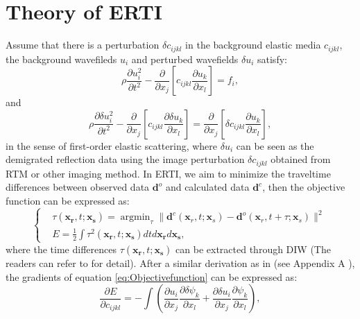 \section{Theory of ERTI}
Assume that there is a perturbation $\delta c_{ijkl}$ in the background elastic media
$c_{ijkl}$, the background wavefileds $u_i$ and perturbed wavefields
$\delta u_i$ satisfy:
\begin{equation}
    \rho \frac{\partial u^2_i}{\partial t^2}  -
    \frac{\partial}{\partial x_j}\left[ 
        c_{ijkl}\frac{\partial u_{k}}{\partial
        x_l}\right]=f_i,
    \label{eq:WE} 
\end{equation}
and
\begin{equation}
    \rho \frac{\partial \delta u^2_i}{\partial t^2}  -
    \frac{\partial}{\partial x_j}\left[ 
        c_{ijkl}\frac{\partial \delta u_{k}}{\partial
        x_l}\right]=\frac{\partial}{\partial x_j}\left[\delta c_{ijkl}\frac{\partial u_{k}}{\partial x_l}\right],
    \label{eq:DeltaWE} 
\end{equation}
in the sense of first-order elastic scattering, where $\delta u_i$ can be seen as the demigrated reflection data using the image
perturbation $\delta c_{ijkl}$ obtained from RTM or other imaging method. In ERTI, we
aim to minimize the traveltime differences between observed data
$\mathbf{d}^{o}$ and
calculated data $\mathbf{d}^{c}$, then
the objective function can be expressed as:
\begin{equation}
	\left\{
		\begin{aligned}
			&\tau(\mathbf{x_r},t;\mathbf{x_s})=\mathop{\arg\min}_{\tau}
			\parallel\mathbf{d}^{c}(\mathbf{x}_r,t;\mathbf{x}_s)-\mathbf{d}^{o}(\mathbf{x}_r,t+\tau;\mathbf{x}_s)\parallel^2\\
    &E=\frac{1}{2}\int\tau^2(\mathbf{x_r},t;\mathbf{x_s})dtd\mathbf{x_r}d\mathbf{x_s},
		\end{aligned}
	\right.
    \label{eq:Objectivefunction} 
\end{equation}
where the time differences $\tau(\mathbf{x_r},t;\mathbf{x_s})$ can be extracted
through DIW (The readers can refer to \cite{Hale2013} for detail).
After a similar derivation as in \cite{Ma2013} (see Appendix A ), the gradients of equation \eqref{eq:Objectivefunction} can be expressed as:
\begin{equation}
	\frac{\partial E}{\partial c_{ijkl}}=-\int (\frac{\partial u_{i}}{\partial
	x_j}\frac{\partial \delta \psi_{k}}{\partial x_l}+\frac{\partial \delta u_{i}}{\partial
	x_j}\frac{\partial \psi_{k}}{\partial x_l}),
    \label{eq:GradientCijkl}
\end{equation}
